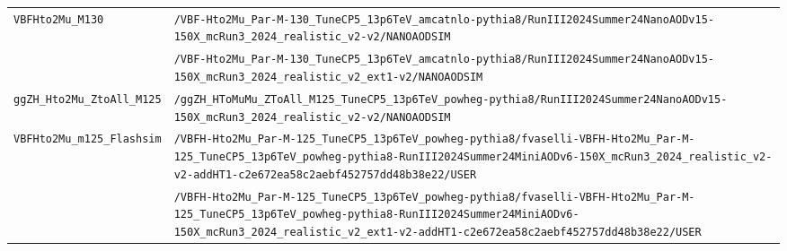 \begin{longtable}{@{}>{\RaggedRight\arraybackslash}p{} >{\RaggedRight\arraybackslash}p{}@{}}
\addlinespace[2pt]
\texttt{VBFHto2Mu\_\allowbreak{}M130} & \texttt{/\allowbreak{}VBF-\allowbreak{}Hto2Mu\_\allowbreak{}Par-\allowbreak{}M-\allowbreak{}130\_\allowbreak{}TuneCP5\_\allowbreak{}13p6TeV\_\allowbreak{}amcatnlo-\allowbreak{}pythia8/\allowbreak{}RunIII2024Summer24NanoAODv15-\allowbreak{}150X\_\allowbreak{}mcRun3\_\allowbreak{}2024\_\allowbreak{}realistic\_\allowbreak{}v2-\allowbreak{}v2/\allowbreak{}NANOAODSIM} \\
 & \texttt{/\allowbreak{}VBF-\allowbreak{}Hto2Mu\_\allowbreak{}Par-\allowbreak{}M-\allowbreak{}130\_\allowbreak{}TuneCP5\_\allowbreak{}13p6TeV\_\allowbreak{}amcatnlo-\allowbreak{}pythia8/\allowbreak{}RunIII2024Summer24NanoAODv15-\allowbreak{}150X\_\allowbreak{}mcRun3\_\allowbreak{}2024\_\allowbreak{}realistic\_\allowbreak{}v2\_\allowbreak{}ext1-\allowbreak{}v2/\allowbreak{}NANOAODSIM} \\
\addlinespace[2pt]
\texttt{ggZH\_\allowbreak{}Hto2Mu\_\allowbreak{}ZtoAll\_\allowbreak{}M125} & \texttt{/\allowbreak{}ggZH\_\allowbreak{}HToMuMu\_\allowbreak{}ZToAll\_\allowbreak{}M125\_\allowbreak{}TuneCP5\_\allowbreak{}13p6TeV\_\allowbreak{}powheg-\allowbreak{}pythia8/\allowbreak{}RunIII2024Summer24NanoAODv15-\allowbreak{}150X\_\allowbreak{}mcRun3\_\allowbreak{}2024\_\allowbreak{}realistic\_\allowbreak{}v2-\allowbreak{}v2/\allowbreak{}NANOAODSIM} \\
\addlinespace[2pt]
\texttt{VBFHto2Mu\_\allowbreak{}m125\_\allowbreak{}Flashsim} & \texttt{/\allowbreak{}VBFH-\allowbreak{}Hto2Mu\_\allowbreak{}Par-\allowbreak{}M-\allowbreak{}125\_\allowbreak{}TuneCP5\_\allowbreak{}13p6TeV\_\allowbreak{}powheg-\allowbreak{}pythia8/\allowbreak{}fvaselli-\allowbreak{}VBFH-\allowbreak{}Hto2Mu\_\allowbreak{}Par-\allowbreak{}M-\allowbreak{}125\_\allowbreak{}TuneCP5\_\allowbreak{}13p6TeV\_\allowbreak{}powheg-\allowbreak{}pythia8-\allowbreak{}RunIII2024Summer24MiniAODv6-\allowbreak{}150X\_\allowbreak{}mcRun3\_\allowbreak{}2024\_\allowbreak{}realistic\_\allowbreak{}v2-\allowbreak{}v2-\allowbreak{}addHT1-\allowbreak{}c2e672ea58c2aebf452757dd48b38e22/\allowbreak{}USER} \\
 & \texttt{/\allowbreak{}VBFH-\allowbreak{}Hto2Mu\_\allowbreak{}Par-\allowbreak{}M-\allowbreak{}125\_\allowbreak{}TuneCP5\_\allowbreak{}13p6TeV\_\allowbreak{}powheg-\allowbreak{}pythia8/\allowbreak{}fvaselli-\allowbreak{}VBFH-\allowbreak{}Hto2Mu\_\allowbreak{}Par-\allowbreak{}M-\allowbreak{}125\_\allowbreak{}TuneCP5\_\allowbreak{}13p6TeV\_\allowbreak{}powheg-\allowbreak{}pythia8-\allowbreak{}RunIII2024Summer24MiniAODv6-\allowbreak{}150X\_\allowbreak{}mcRun3\_\allowbreak{}2024\_\allowbreak{}realistic\_\allowbreak{}v2\_\allowbreak{}ext1-\allowbreak{}v2-\allowbreak{}addHT1-\allowbreak{}c2e672ea58c2aebf452757dd48b38e22/\allowbreak{}USER} \\

\end{longtable}

